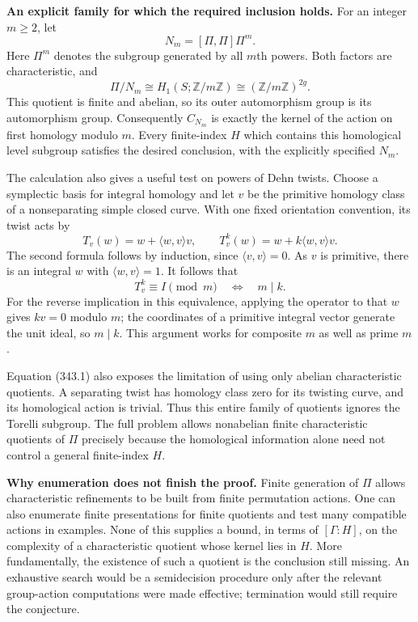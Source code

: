 \documentclass[11pt]{article}
\begin{document}
\textbf{An explicit family for which the required inclusion holds.} For an integer $m\geq2$, let
\[
 N_m=[\Pi,\Pi]\Pi^m.
\]
Here $\Pi^m$ denotes the subgroup generated by all $m$th powers. Both factors are characteristic, and
\[
 \Pi/N_m\cong H_1(S;\mathbb Z/m\mathbb Z)
       \cong(\mathbb Z/m\mathbb Z)^{2g}.
\]
This quotient is finite and abelian, so its outer automorphism group is its automorphism group. Consequently $C_{N_m}$ is exactly the kernel of the action on first homology modulo $m$. Every finite-index $H$ which contains this homological level subgroup satisfies the desired conclusion, with the explicitly specified $N_m$.

The calculation also gives a useful test on powers of Dehn twists. Choose a symplectic basis for integral homology and let $v$ be the primitive homology class of a nonseparating simple closed curve. With one fixed orientation convention, its twist acts by
\[
 T_v(w)=w+\langle w,v\rangle v,
 \qquad T_v^k(w)=w+k\langle w,v\rangle v.
 \tag{343.1}
\]
The second formula follows by induction, since $\langle v,v\rangle=0$. As $v$ is primitive, there is an integral $w$ with $\langle w,v\rangle=1$. It follows that
\[
 T_v^k\equiv I\pmod m\quad\Longleftrightarrow\quad m\mid k.
\]
For the reverse implication in this equivalence, applying the operator to that $w$ gives $kv=0$ modulo $m$; the coordinates of a primitive integral vector generate the unit ideal, so $m\mid k$. This argument works for composite $m$ as well as prime $m$.

Equation (343.1) also exposes the limitation of using only abelian characteristic quotients. A separating twist has homology class zero for its twisting curve, and its homological action is trivial. Thus this entire family of quotients ignores the Torelli subgroup. The full problem allows nonabelian finite characteristic quotients of $\Pi$ precisely because the homological information alone need not control a general finite-index $H$.

\textbf{Why enumeration does not finish the proof.} Finite generation of $\Pi$ allows characteristic refinements to be built from finite permutation actions. One can also enumerate finite presentations for finite quotients and test many compatible actions in examples. None of this supplies a bound, in terms of $[\Gamma:H]$, on the complexity of a characteristic quotient whose kernel lies in $H$. More fundamentally, the existence of such a quotient is the conclusion still missing. An exhaustive search would be a semidecision procedure only after the relevant group-action computations were made effective; termination would still require the conjecture.
\end{document}
